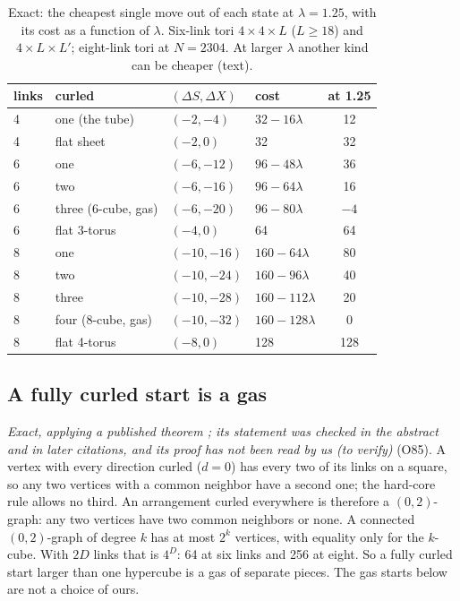 \documentclass[aps,pre,10pt,twocolumn,superscriptaddress,nofootinbib]{revtex4-2}
\begin{document}
\begin{table}[b]
\caption{Exact: the cheapest single move out of each state at $\lambda = 1.25$, with its cost as a function of
$\lambda$. Six-link tori $4 \times 4 \times L$ ($L \ge 18$) and $4 \times L \times L'$; eight-link tori at
$N = 2304$. At larger $\lambda$ another kind can be cheaper (text).}
\label{tab:walls}
\begin{ruledtabular}
\begin{tabular}{llllc}
links & curled & $(\Delta S, \Delta X)$ & cost & at 1.25 \\
\hline
4 & one (the tube) & $(-2, -4)$ & $32 - 16\lambda$ & 12 \\
4 & flat sheet & $(-2, 0)$ & 32 & 32 \\
6 & one & $(-6, -12)$ & $96 - 48\lambda$ & 36 \\
6 & two & $(-6, -16)$ & $96 - 64\lambda$ & 16 \\
6 & three (6-cube, gas) & $(-6, -20)$ & $96 - 80\lambda$ & $-4$ \\
6 & flat 3-torus & $(-4, 0)$ & 64 & 64 \\
8 & one & $(-10, -16)$ & $160 - 64\lambda$ & 80 \\
8 & two & $(-10, -24)$ & $160 - 96\lambda$ & 40 \\
8 & three & $(-10, -28)$ & $160 - 112\lambda$ & 20 \\
8 & four (8-cube, gas) & $(-10, -32)$ & $160 - 128\lambda$ & 0 \\
8 & flat 4-torus & $(-8, 0)$ & 128 & 128 \\
\end{tabular}
\end{ruledtabular}
\end{table}

\subsection{A fully curled start is a gas}

\emph{Exact, applying a published theorem \cite{Mul79}; its statement was checked in the abstract and in later
citations, and its proof has not been read by us (to verify)} (O85). A vertex with every direction curled ($d = 0$)
has every two of its links on a square, so any two vertices with a common neighbor have a second one; the hard-core
rule allows no third. An arrangement curled everywhere is therefore a $(0,2)$-graph: any two vertices have two
common neighbors or none. A connected $(0,2)$-graph of degree $k$ has at most $2^k$ vertices, with equality only for
the $k$-cube. With $2D$ links that is $4^D$: 64 at six links and 256 at eight. So a fully curled start larger than
one hypercube is a gas of separate pieces. The gas starts below are not a choice of ours.
\end{document}
